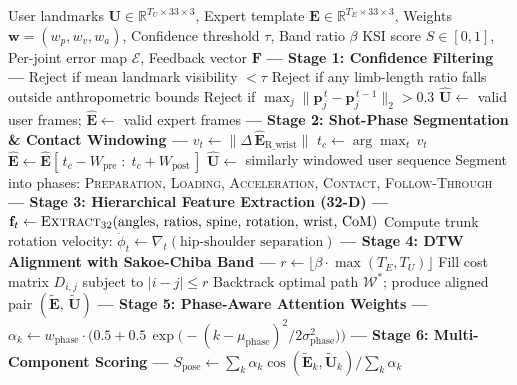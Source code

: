 \documentclass[pdflatex,sn-mathphys-num]{sn-jnl}
\theoremstyle{thmstyleone}%
\theoremstyle{thmstyletwo}%
\theoremstyle{thmstylethree}%
\begin{document}
\begin{algorithm}[htbp]
\caption{   Kinematic Similarity Index (KSI)}
\label{alg:ksi}
\begin{algorithmic}[1]
\Require User landmarks $\mathbf{U} \in \mathbb{R}^{T_U \times 33 \times 3}$, Expert template $\mathbf{E} \in \mathbb{R}^{T_E \times 33 \times 3}$, Weights $\mathbf{w} = (w_p, w_v, w_a)$, Confidence threshold $\tau$, Band ratio $\beta$
\Ensure KSI score $S \in [0,1]$, Per-joint error map $\mathcal{E}$, Feedback vector $\mathbf{F}$
\Statex
\State \textbf{--- Stage 1: Confidence Filtering ---}
    \State Reject if mean landmark visibility $< \tau$
    \State Reject if any limb-length ratio falls outside anthropometric bounds
    \State Reject if $\max_j \|\mathbf{p}_j^{\,t} - \mathbf{p}_j^{\,t-1}\|_2 > 0.3$ 
\EndFor
\State $\hat{\mathbf{U}} \leftarrow$ valid user frames; \quad $\hat{\mathbf{E}} \leftarrow$ valid expert frames
\Statex
\State \textbf{--- Stage 2: Shot-Phase Segmentation \& Contact Windowing ---}
\State $v_t \leftarrow \|\Delta\, \hat{\mathbf{E}}_{\text{R\_wrist}}\|$ 
\State $t_c \leftarrow \arg\max_t\, v_t$ 
\State $\hat{\mathbf{E}} \leftarrow \hat{\mathbf{E}}[\,t_c - W_{\text{pre}} \;:\; t_c + W_{\text{post}}\,]$
\State $\hat{\mathbf{U}} \leftarrow$ similarly windowed user sequence
\State Segment into phases: \textsc{Preparation, Loading, Acceleration, Contact, Follow-Through}
\Statex
\State \textbf{--- Stage 3: Hierarchical Feature Extraction (32-D) ---}
    \State $\mathbf{f}_t \leftarrow \textsc{Extract}_{32}(\text{angles, ratios, spine, rotation, wrist, CoM})$
\EndFor
\State Compute trunk rotation velocity: $\dot{\phi}_t \leftarrow \nabla_t(\text{hip-shoulder separation})$
\Statex
\State \textbf{--- Stage 4: DTW Alignment with Sakoe-Chiba Band ---}
\State $r \leftarrow \lfloor \beta \cdot \max(T_E, T_U) \rfloor$ 
\State Fill cost matrix $D_{i,j}$ subject to $|i-j| \le r$
\State Backtrack optimal path $\mathcal{W}^{*}$; produce aligned pair $(\tilde{\mathbf{E}},\, \tilde{\mathbf{U}})$
\Statex
\State \textbf{--- Stage 5: Phase-Aware Attention Weights ---}
    \State $\alpha_k \leftarrow w_{\text{phase}} \cdot \bigl(0.5 + 0.5\,\exp\!\bigl(-{(k - \mu_{\text{phase}})^2}/{2\sigma_{\text{phase}}^2}\bigr)\bigr)$
\EndFor
\Statex
\State \textbf{--- Stage 6: Multi-Component Scoring ---} 
\State $S_{\text{pose}} \leftarrow {\sum_k \alpha_k \cos(\tilde{\mathbf{E}}_k, \tilde{\mathbf{U}}_k)}/{\sum_k \alpha_k}$

\end{algorithmic}
\end{algorithm}
\end{document}
